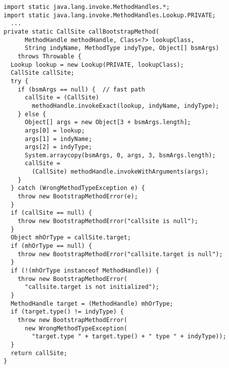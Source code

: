 {\scriptsize \begin{verbatim}
  import static java.lang.invoke.MethodHandles.*;
  import static java.lang.invoke.MethodHandles.Lookup.PRIVATE;
    ...
  private static CallSite callBootstrapMethod(
        MethodHandle methodHandle, Class<?> lookupClass,
        String indyName, MethodType indyType, Object[] bsmArgs)
      throws Throwable {
    Lookup lookup = new Lookup(PRIVATE, lookupClass);
    CallSite callSite;
    try {
      if (bsmArgs == null) {  // fast path
        callSite = (CallSite)
          methodHandle.invokeExact(lookup, indyName, indyType);
      } else {
        Object[] args = new Object[3 + bsmArgs.length];
        args[0] = lookup;
        args[1] = indyName;
        args[2] = indyType;
        System.arraycopy(bsmArgs, 0, args, 3, bsmArgs.length);
        callSite =
          (CallSite) methodHandle.invokeWithArguments(args);
      }
    } catch (WrongMethodTypeException e) {
      throw new BootstrapMethodError(e);
    }
    if (callSite == null) {
      throw new BootstrapMethodError("callsite is null");
    }
    Object mhOrType = callSite.target;
    if (mhOrType == null) {
      throw new BootstrapMethodError("callsite.target is null");
    }
    if (!(mhOrType instanceof MethodHandle)) {
      throw new BootstrapMethodError(
        "callsite.target is not initialized");
    }
    MethodHandle target = (MethodHandle) mhOrType;
    if (target.type() != indyType) {
      throw new BootstrapMethodError(
        new WrongMethodTypeException(
          "target.type " + target.type() + " type " + indyType));
    }
    return callSite;
  }
\end{verbatim} }
